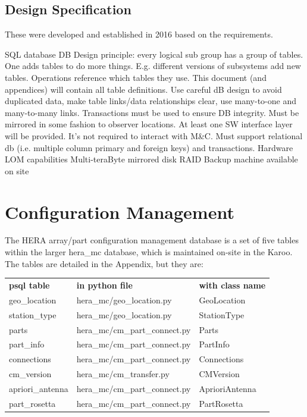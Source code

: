 \documentclass{article}
\newcommand{\mc}{M\&C}
\begin{document}
\subsection{Design Specification}
These were developed and established in 2016 based on the requirements.

\begin{outline}[enumerate]
	\1 SQL database
		\2 DB Design principle: every logical sub group has a group of tables.  One adds tables to do more things. E.g. different versions of subsystems add new tables. Operations reference which tables they use.
		\2 This document (and appendices) will contain all table definitions.
		\2 Use careful dB design to avoid duplicated data, make table links/data relationships clear, use many-to-one and many-to-many links.
		\2 Transactions must be used to ensure DB integrity.
		\2 Must be mirrored in some fashion to observer locations.
	\1 At least one SW interface layer will be provided.
		\2 It's not required to interact with \mc.
		\2 Must support relational db (i.e. multiple column primary and foreign keys) and transactions.
	\1 Hardware
		\2 LOM capabilities
		\2 Multi-teraByte mirrored disk RAID
		\2 Backup machine available on site
\end{outline}




\section{Configuration Management}
\label{sec:config}

The HERA array/part configuration management database is a set of five tables within the larger hera\_mc database, which is maintained on-site in the Karoo.  The tables are detailed in the Appendix,
but they are:

\begin{center}
\begin{tabular}{l l l}
         {\bf psql table} & {\bf in python file}  &  {\bf with class name} \\
	geo\_location 	& hera\_mc/geo\_location.py & GeoLocation \\
	station\_type 	& hera\_mc/geo\_location.py & StationType \\
	parts 	& hera\_mc/cm\_part\_connect.py & Parts \\
	part\_info 	         & hera\_mc/cm\_part\_connect.py & PartInfo \\
	connections 	& hera\_mc/cm\_part\_connect.py & Connections \\
	cm\_version      & hera\_mc/cm\_transfer.py & CMVersion\\
	apriori\_antenna & hera\_mc/cm\_part\_connect.py & AprioriAntenna\\
	part\_rosetta      & hera\_mc/cm\_part\_connect.py & PartRosetta
\end{tabular}
\end{center}
\end{document}

